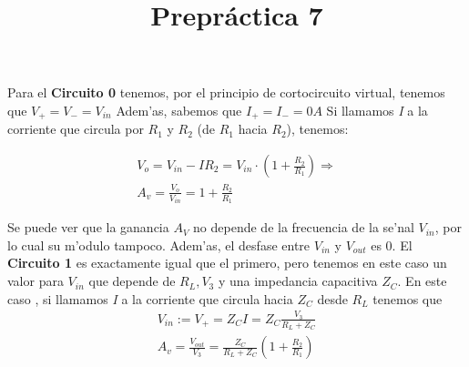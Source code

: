 \documentclass{article}
\title{Prepr\'actica 7}
\author{}
\newcommand\tab[1][0.5cm]{\hspace*{#1}}
\begin{document}
\maketitle

Para el \textbf{Circuito 0} tenemos, por el principio de cortocircuito virtual, tenemos que $V_+ = V_- = V_{in}$ \newline \tab Adem'as, sabemos que $I_+ = I_- = 0 \si{A}$  \newline \tab Si llamamos \textit{I} a la corriente que circula por $ R_1$ y $R_2$ (de $R_1$ hacia $R_2$), tenemos:\

\begin{equation*}
\begin{gathered}
  V_o = V_{in} - IR_2 = V_{in}\cdot \left(1+ \frac{R_2}{R_1}\right)  \Longrightarrow \\
 A_v = \frac{V_o}{V_{in}} = 1+ \frac{R_2}{R_1}
\end{gathered}
\end{equation*}

\tab Se puede ver que la ganancia $A_V$ no depende de la frecuencia de la se'nal $V_{in}$, por lo cual su m'odulo tampoco. Adem'as, el desfase entre $V_{in}$ y $V_{out}$ es 0.\newline \newline
\tab El \textbf{Circuito 1 }es exactamente igual que el primero, pero tenemos en este caso un valor para $V_{in}$ que depende de $R_L, V_3$ y una impedancia capacitiva $Z_C$.\newline\tab
En este caso , si llamamos \textit{I} a la corriente que circula hacia $Z_C$ desde $R_L$ tenemos que 
\begin{equation*}
\begin{gathered}
V_{in} := V_{+} =  Z_C I = Z_C\frac{V_3}{R_L + Z_C} \\
A_v = \frac{V_{out}}{V_3} =  \frac{Z_C}{R_L + Z_C} \left(1+ \frac{R_2}{R_1}\right)
\end{gathered}
\end{equation*} 
\end{document}
